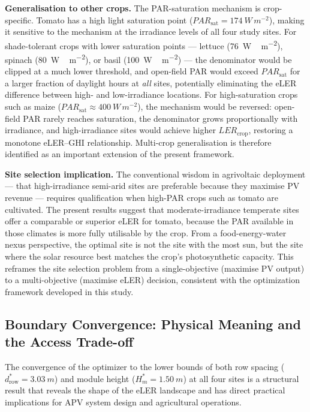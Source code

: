 \textbf{Generalisation to other crops.} The PAR-saturation mechanism
is crop-specific. Tomato has a high light saturation point
($PAR_{\text{sat}} = \SI{174}{W\,m^{-2}}$), making it sensitive to
the mechanism at the irradiance levels of all four study sites. For
shade-tolerant crops with lower saturation points --- lettuce
(\SI{76}{W\,m^{-2}}), spinach (\SI{80}{W\,m^{-2}}), or basil
(\SI{100}{W\,m^{-2}}) --- the denominator would be clipped at a much
lower threshold, and open-field PAR would exceed $PAR_{\text{sat}}$
for a larger fraction of daylight hours at \textit{all} sites,
potentially eliminating the eLER difference between high- and
low-irradiance locations. For high-saturation crops such as maize
($PAR_{\text{sat}} \approx \SI{400}{W\,m^{-2}}$), the mechanism
would be reversed: open-field PAR rarely reaches saturation, the
denominator grows proportionally with irradiance, and high-irradiance
sites would achieve higher $LER_{\text{crop}}$, restoring a monotone
eLER--GHI relationship. Multi-crop generalisation is therefore
identified as an important extension of the present framework.

\textbf{Site selection implication.} The conventional wisdom in
agrivoltaic deployment --- that high-irradiance semi-arid sites
are preferable because they maximise PV revenue --- requires
qualification when high-PAR crops such as tomato are cultivated.
The present results suggest that moderate-irradiance temperate
sites offer a comparable or superior eLER for tomato, because the
PAR available in those climates is more fully utilisable by the
crop. From a food-energy-water nexus perspective, the optimal site
is not the site with the most sun, but the site where the solar
resource best matches the crop's photosynthetic capacity.
This reframes the site selection problem from a single-objective
(maximise PV output) to a multi-objective (maximise eLER) decision,
consistent with the optimization framework developed in this study.

\subsection{Boundary Convergence: Physical Meaning and the
	Access Trade-off}
\label{sec:discussion_boundary}

\hspace{1cm}The convergence of the optimizer to the lower bounds of
both row spacing ($d_{\text{row}}^* = \SI{3.03}{m}$) and module
height ($H_m^* = \SI{1.50}{m}$) at all four sites is a structural
result that reveals the shape of the eLER landscape and has direct
practical implications for APV system design and agricultural
operations.

